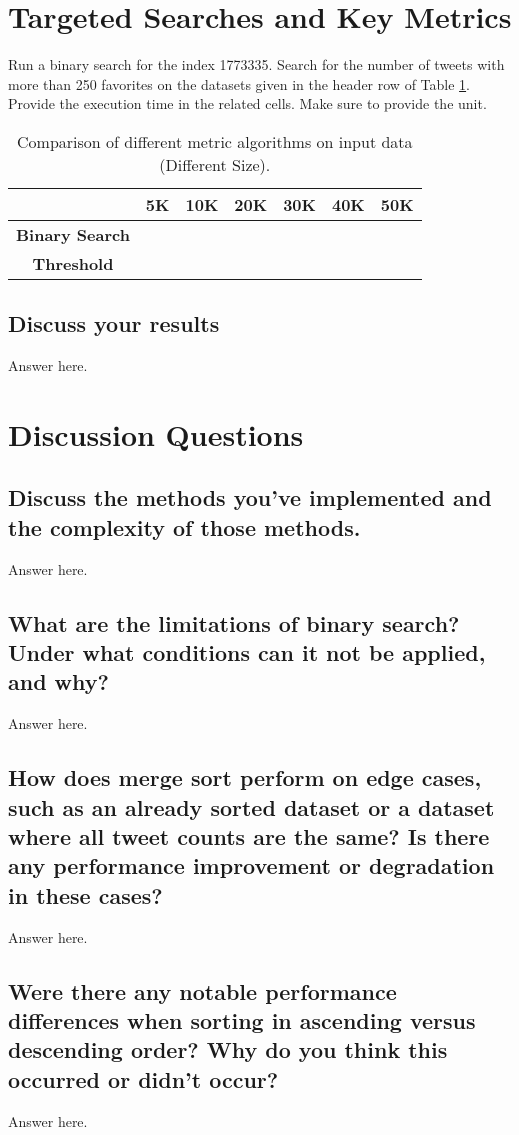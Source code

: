 \section{Targeted Searches and Key Metrics}

Run a binary search for the index 1773335. Search for the number of tweets with more than 250 favorites on the datasets given in the header row of Table \ref{dataSizeMetric}. Provide the execution time in the related cells. Make sure to provide the unit. 

\begin{table}[h!]
\centering
\begin{tabular}{|c|c|c|c|c|c|c|}
\hline
                        & \textbf{5K} & \textbf{10K} & \textbf{20K} & \textbf{30K} & \textbf{40K} & \textbf{50K} \\ \hline
\textbf{Binary Search} & & & & & & \\ \hline
\textbf{Threshold} & & & & & & \\ \hline
\end{tabular}
\caption{Comparison of different metric algorithms on input data (Different Size). }
\label{dataSizeMetric}
\end{table}

\subsection*{Discuss your results}
Answer here. 

\section{Discussion Questions}

\subsection*{Discuss the methods you've implemented and the complexity of those methods.}
Answer here. 

\subsection*{What are the limitations of binary search? Under what conditions can it not be applied, and why?}
Answer here. 

\subsection*{How does merge sort perform on edge cases, such as an already sorted dataset or a dataset where all tweet counts are the same? Is there any performance improvement or degradation in these cases?}
Answer here. 

\subsection*{Were there any notable performance differences when sorting in ascending versus descending order? Why do you think this occurred or didn’t occur?}
Answer here. 
